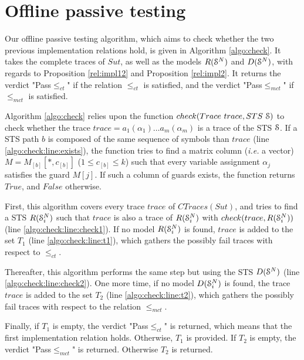 \section{Offline passive testing}
\label{sec:testing:offline}

Our offline passive testing algorithm, which aims to check
whether the two previous implementation relations hold, is given
in Algorithm \ref{algo:check}. It takes the complete traces of
$\mathit{Sut}$, as well as the models $R(\EuScript{S}^{N})$ and
$D(\EuScript{S}^{N})$, with regards to Proposition
\ref{rel:impl12} and Proposition \ref{rel:impl2}. It returns the
verdict "Pass$\leq_{ct}$" if the relation $\leq_{ct}$ is
satisfied, and the verdict "Pass$\leq_{mct}$" if $\leq_{mct}$ is
satisfied.

Algorithm \ref{algo:check} relies upon the function ${check(Trace
~trace, STS ~\EuScript{S})}$ to check whether the trace $trace =
a_1(\alpha_1) \dots a_m(\alpha_m)$ is a trace of the STS
$\EuScript{S}$. If a STS path $b$ is composed of the same
sequence of symbols than $trace$ (line
\ref{algo:check:line:exists}), the function tries to find a
matrix column (\emph{i.e.} a vector) $M = M_{[b]}[*,c_{[b]}]$ ($1
\leq c_{[b]} \leq k$) such that every variable assignment
$\alpha_j$ satisfies the guard $M[j]$. If such a column of guards
exists, the function returns $True$, and $False$ otherwise.

First, this algorithm covers every trace $trace$ of
$CTraces({Sut})$, and tries to find a STS $R(\EuScript{S}_i^{N})$
such that $trace$ is also a trace of $R(\EuScript{S}_i^{N})$ with
$check(trace, R(\EuScript{S}_i^{N}))$ (line
\ref{algo:check:line:check1}).  If no model
$R(\EuScript{S}_i^{N})$ is found, $trace$ is added to the set
$T_1$ (line \ref{algo:check:line:t1}), which gathers the possibly
fail traces with respect to $\leq_{ct}$.

Thereafter, this algorithm performs the same step but using the
STS $D(\EuScript{S}^{N})$ (line \ref{algo:check:line:check2}).
One more time, if no model $D(\EuScript{S}_i^{N})$ is found, the
trace $trace$ is added to the set $T_2$ (line
\ref{algo:check:line:t2}), which gathers the possibly fail
traces with respect to the relation $\leq_{mct}$.

Finally, if $T_1$ is empty, the verdict "Pass$\leq_{ct}$" is
returned, which means that the first implementation relation
holds. Otherwise, $T_1$ is provided. If $T_2$ is empty, the
verdict "Pass$\leq_{mct}$" is returned. Otherwise $T_2$ is
returned.

